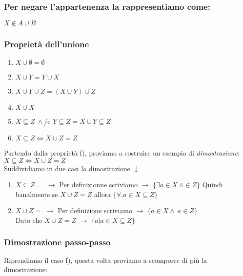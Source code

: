 \documentclass[article,12pt]{book}
\begin{document}
\begin{enumerate}
\subsubsection{Per negare l'appartenenza la rappresentiamo come:}
    \begin{center}
        \(X \notin A \cup B\)
    \end{center}

\newpage

\subsubsection{Proprietà dell'unione }
\begin{enumerate}
    \item \(X \cup \emptyset = \emptyset\)
    \item \(X \cup Y = Y \cup X \)
    \item \(X \cup Y \cup Z = ( X \cup Y) \cup Z\)
    \item \(X \cup X\)
    \item \(X \subseteq Z \ \land \)/e \(Y \subseteq Z = X \cup Y \subseteq Z \)
    \item \(X \subseteq Z \iff X \cup Z = Z \)
\end{enumerate}
\begin{center}
    Partendo dalla proprietà f), proviamo a costruire un esempio di \textit{dimostrazione}: \\[2ex]

    \(X \subseteq Z \iff X \cup Z = Z\) \\[2ex]

    Suddividiamo in due casi la dimostrazione \(\downarrow\)
    \begin{enumerate}
        \item \(X \subseteq Z =\) \(\rightarrow\) Per definizionne scriviamo \(\rightarrow\)  \(\{\exists a \in X \ \land\in Z\}\)
        Quindi banalmente se \(X \cup Z = Z\) allora \(\{\forall .a \in X \subseteq Z\}\)
        \item \(X \cup Z =\) \(\rightarrow\) Per definizione scriviamo \(\rightarrow\) \(\{a \in X \land \ a \in Z\}\) \\[ex]
        Dato che \(X \cup Z = Z\) \(\rightarrow\) \(\{a | a \in X \subseteq Z\}\)    
    \end{enumerate}
\end{center}

\subsubsection{Dimostrazione passo-passo}
\begin{center}
    Riprendiamo il caso f), questa volta proviamo a scomporre di più la dimostrazione: \\[2ex]


\end{center}
\end{enumerate}
\end{document}
